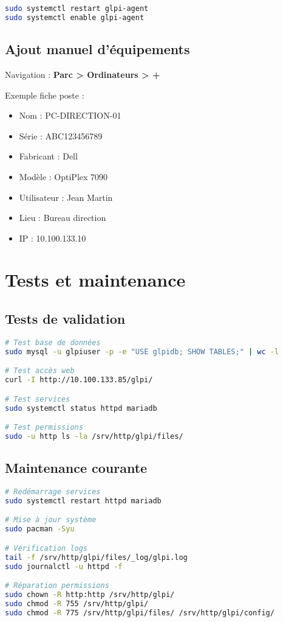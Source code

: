 \documentclass[12pt,a4paper]{article}
\begin{document}
\begin{lstlisting}[language=bash]
sudo systemctl restart glpi-agent
sudo systemctl enable glpi-agent
\end{lstlisting}

\subsection{Ajout manuel d'équipements}
Navigation : \textbf{Parc > Ordinateurs > +}

Exemple fiche poste :
\begin{itemize}
    \item Nom : PC-DIRECTION-01
    \item Série : ABC123456789
    \item Fabricant : Dell
    \item Modèle : OptiPlex 7090
    \item Utilisateur : Jean Martin
    \item Lieu : Bureau direction
    \item IP : 10.100.133.10
\end{itemize}

\section{Tests et maintenance}

\subsection{Tests de validation}
\begin{lstlisting}[language=bash]
# Test base de données
sudo mysql -u glpiuser -p -e "USE glpidb; SHOW TABLES;" | wc -l

# Test accès web
curl -I http://10.100.133.85/glpi/

# Test services
sudo systemctl status httpd mariadb

# Test permissions
sudo -u http ls -la /srv/http/glpi/files/
\end{lstlisting}

\subsection{Maintenance courante}
\begin{lstlisting}[language=bash]
# Redémarrage services
sudo systemctl restart httpd mariadb

# Mise à jour système
sudo pacman -Syu

# Vérification logs
tail -f /srv/http/glpi/files/_log/glpi.log
sudo journalctl -u httpd -f

# Réparation permissions
sudo chown -R http:http /srv/http/glpi/
sudo chmod -R 755 /srv/http/glpi/
sudo chmod -R 775 /srv/http/glpi/files/ /srv/http/glpi/config/
\end{lstlisting}
\end{document}
